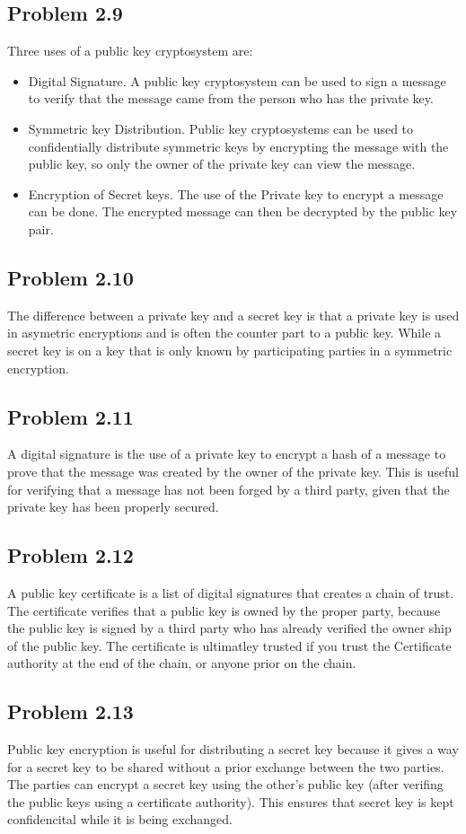 \documentclass[14pt]{article}
\begin{document}
\subsection{Problem  2.9}
Three uses of a public key cryptosystem are:
\begin{itemize}
\item Digital Signature. A public key cryptosystem can be used to sign a message to verify that the message came from the person who has the private key. 
\item Symmetric key Distribution. Public key cryptosystems can be used to confidentially distribute symmetric keys by encrypting the message with the public key, so only the owner of the private key can view the message.
\item Encryption of Secret keys. The use of the Private key to encrypt a message can be done. The encrypted message can then be decrypted by the public key pair.  
\end{itemize}

\subsection{Problem  2.10}
The difference between a private key and a secret key is that a private key is used  in asymetric encryptions and is often the counter part to a public key. While a secret key is on a key that is only known by participating parties in a symmetric encryption. 

\subsection{Problem  2.11}
A digital signature is the use of a private key to encrypt  a hash of a message to prove that the message was created by the owner of the private key. This is useful for verifying that a message has not been forged by a third party, given that the private key has been properly secured. 

\subsection{Problem  2.12}
A public key certificate is a list of digital signatures that creates a chain of trust. The certificate verifies that a public key is owned by the proper party, because the public key is signed by a third party who has already verified the owner ship of the public key. The certificate is ultimatley trusted if you trust the Certificate authority at the end of the chain, or anyone prior on the chain.

\subsection{Problem  2.13}
Public key encryption is useful for distributing a secret key because it gives a way for a secret key to be shared without a prior exchange between the two parties. The parties can encrypt a secret key using the other's public key (after verifing the public keys using a certificate authority). This ensures that secret key is kept confidencital while it is being exchanged.


\newpage




\end{document}
